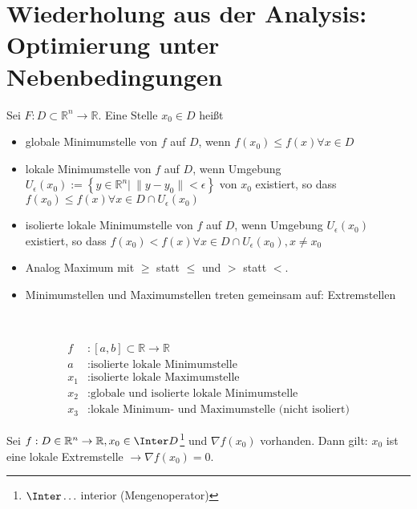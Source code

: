 \section{Wiederholung aus der Analysis: Optimierung unter Nebenbedingungen}
\begin{defi}
Sei $F:D\subset\mathbb{R}^n\rightarrow\mathbb{R}$. Eine Stelle $x_0\in D$ heißt
\begin{itemize}
  \item globale Minimumstelle von $f$ auf $D$, wenn $f(x_0)\le f(x)\forall x\in D$
  \item lokale Minimumstelle von $f$ auf $D$, wenn Umgebung $U_{\epsilon}(x_0):=\left\{y\in\mathbb{R}^n|\ \|y-y_0\|<\epsilon\right\}$ von $x_0$ existiert, so dass $f(x_0)\le
  f(x)\forall x\in D\cap U_{\epsilon}(x_0)$
  \item isolierte lokale Minimumstelle von $f$ auf $D$, wenn Umgebung $U_{\epsilon}(x_0)$ existiert, so dass $f(x_0)<f(x)\forall x\in D\cap U_{\epsilon}(x_0), x\neq
  x_0$
  \item Analog Maximum mit $\ge$ statt $\le$ und $>$ statt $<$.
  \item Minimumstellen und Maximumstellen treten gemeinsam auf: Extremstellen
\end{itemize}
\end{defi}
\begin{exmp}\hspace{1cm}\\
\begin{minipage}[c][][c]{0.3\textwidth}
\centering

\end{minipage}
\hfill
\begin{minipage}[c][][c]{0.7\textwidth}
\begin{align*}
f &: [a,b]\subset\mathbb{R}\rightarrow \mathbb{R}\\
a &: \text{isolierte lokale Minimumstelle}\\
x_1 &: \text{isolierte lokale Maximumstelle}\\
x_2 &: \text{globale und isolierte lokale Minimumstelle}\\
x_3 &: \text{lokale Minimum- und Maximumstelle (nicht isoliert)}
\end{align*}
\end{minipage}
\end{exmp}
\begin{satz}\label{satz:1}
Sei $f:D\in\mathbb{R}^n\rightarrow\mathbb{R}, x_0\in\Inter D$\footnote{$\Inter\ldots $ interior (Mengenoperator)} und $\nabla f(x_0)$ vorhanden. Dann gilt: $x_0$ ist eine lokale
Extremstelle $\rightarrow \nabla f(x_0)=0$.
\end{satz}
